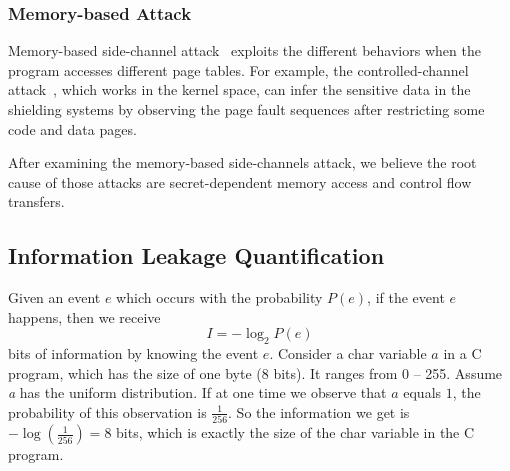\subsubsection{Memory-based Attack}
Memory-based side-channel attack~\cite{7163052} exploits the different behaviors when the
program accesses different page tables. For example, the controlled-channel attack~\cite{7163052},
which works in the kernel space, can infer the sensitive data in the shielding systems by
observing the page fault sequences after restricting some code and
data pages. 

After examining the memory-based side-channels attack, we believe the root
cause of those attacks are secret-dependent memory access and control
flow transfers.  

%
%


\subsection{Information Leakage Quantification}


Given an event $e$ which occurs with the probability $P(e)$, if the event $e$ happens, 
then we receive
\begin{displaymath}
    I = - \log_2P(e)
\end{displaymath}
bits of information by knowing the event $e$.
Consider a char variable $a$ in a C program, which has the size
of one byte (8 bits). It ranges from 0 -- 255.  Assume
 \textit{a} has the uniform distribution. If at one time we observe that $a$
equals $1$, the probability of this observation is $\frac{1}{256}$. So the information we get is 
$-\log(\frac{1}{256}) = 8$ bits, which is exactly the size of the char variable in the C program.

